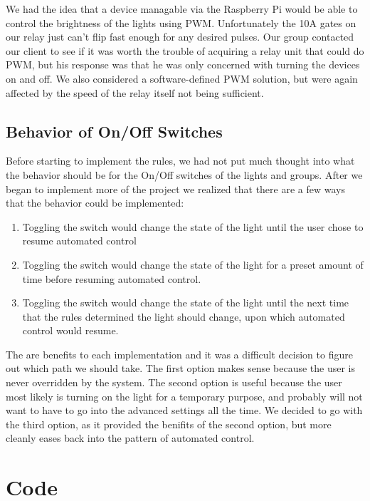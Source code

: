 \documentclass[oneside,openright]{book}
\begin{document}
We had the idea that a device managable via the Raspberry Pi would be able to
control the brightness of the lights using PWM. Unfortunately the 10A gates on
our relay just can't flip fast enough for any desired pulses. Our group
contacted our client to see if it was worth the trouble of acquiring a relay
unit that could do PWM, but his response was that he was only concerned with
turning the devices on and off. We also considered a software-defined PWM
solution, but were again affected by the speed of the relay itself not being
sufficient.

\subsection{Behavior of On/Off Switches}

Before starting to implement the rules, we had not put much thought into what
the behavior should be for the On/Off switches of the lights and groups. After
we began to implement more of the project we realized that there are a few ways
that the behavior could be implemented:

\begin{enumerate}
  \item Toggling the switch would change the state of the light until the user
      chose to resume automated control
  \item Toggling the switch would change the state of the light for a preset
      amount of time before resuming automated control.
  \item Toggling the switch would change the state of the light until the next
      time that the rules determined the light should change, upon which
      automated control would resume.
\end{enumerate}

The are benefits to each implementation and it was a difficult decision to
figure out which path we should take. The first option makes sense because the
user is never overridden by the system. The second option is useful because the
user most likely is turning on the light for a temporary purpose, and probably
will not want to have to go into the advanced settings all the time. We decided
to go with the third option, as it provided the benifits of the second option,
but more cleanly eases back into the pattern of automated control.

\section{Code}
\end{document}
